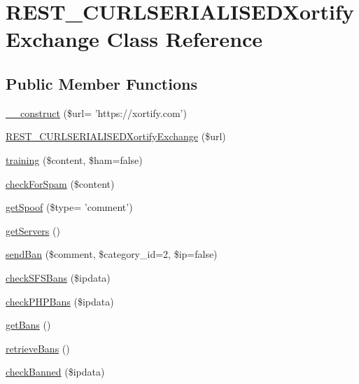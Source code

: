 \hypertarget{class_r_e_s_t___c_u_r_l_s_e_r_i_a_l_i_s_e_d_xortify_exchange}{\section{R\-E\-S\-T\-\_\-\-C\-U\-R\-L\-S\-E\-R\-I\-A\-L\-I\-S\-E\-D\-Xortify\-Exchange Class Reference}
\label{class_r_e_s_t___c_u_r_l_s_e_r_i_a_l_i_s_e_d_xortify_exchange}
}
\subsection*{Public Member Functions}
\begin{DoxyCompactItemize}
\item 
\hyperlink{class_r_e_s_t___c_u_r_l_s_e_r_i_a_l_i_s_e_d_xortify_exchange_a181d8a7452f7fd69c483c46a51cc6cef}{\-\_\-\-\_\-construct} (\$url= 'https\-://xortify.\-com')
\item 
\hyperlink{class_r_e_s_t___c_u_r_l_s_e_r_i_a_l_i_s_e_d_xortify_exchange_a7fa5fed254db9c1ef2a324cd17e31b12}{R\-E\-S\-T\-\_\-\-C\-U\-R\-L\-S\-E\-R\-I\-A\-L\-I\-S\-E\-D\-Xortify\-Exchange} (\$url)
\item 
\hyperlink{class_r_e_s_t___c_u_r_l_s_e_r_i_a_l_i_s_e_d_xortify_exchange_a3b3be735e633ba330c6b5d086aa508cd}{training} (\$content, \$ham=false)
\item 
\hyperlink{class_r_e_s_t___c_u_r_l_s_e_r_i_a_l_i_s_e_d_xortify_exchange_a7a4f53c3841dc7806455261af557d514}{check\-For\-Spam} (\$content)
\item 
\hyperlink{class_r_e_s_t___c_u_r_l_s_e_r_i_a_l_i_s_e_d_xortify_exchange_ae7926cba79660f77479306100f492c03}{get\-Spoof} (\$type= 'comment')
\item 
\hyperlink{class_r_e_s_t___c_u_r_l_s_e_r_i_a_l_i_s_e_d_xortify_exchange_a882f365bc81e207dc2123ef707735e82}{get\-Servers} ()
\item 
\hyperlink{class_r_e_s_t___c_u_r_l_s_e_r_i_a_l_i_s_e_d_xortify_exchange_a0293acfa4afe0cb5b2816352a35d8ca7}{send\-Ban} (\$comment, \$category\-\_\-id=2, \$ip=false)
\item 
\hyperlink{class_r_e_s_t___c_u_r_l_s_e_r_i_a_l_i_s_e_d_xortify_exchange_a985a563a84e3e5c54694fcce192bda53}{check\-S\-F\-S\-Bans} (\$ipdata)
\item 
\hyperlink{class_r_e_s_t___c_u_r_l_s_e_r_i_a_l_i_s_e_d_xortify_exchange_aeb1bf9aaee4718870adbd07333490aaf}{check\-P\-H\-P\-Bans} (\$ipdata)
\item 
\hyperlink{class_r_e_s_t___c_u_r_l_s_e_r_i_a_l_i_s_e_d_xortify_exchange_aea26db2906896833d32445a698fc4cdc}{get\-Bans} ()
\item 
\hyperlink{class_r_e_s_t___c_u_r_l_s_e_r_i_a_l_i_s_e_d_xortify_exchange_a4af29af927aae9aada97ef0c2cd08fa1}{retrieve\-Bans} ()
\item 
\hyperlink{class_r_e_s_t___c_u_r_l_s_e_r_i_a_l_i_s_e_d_xortify_exchange_ae41df0f26620b727f7f63342648f6474}{check\-Banned} (\$ipdata)
\end{DoxyCompactItemize}
